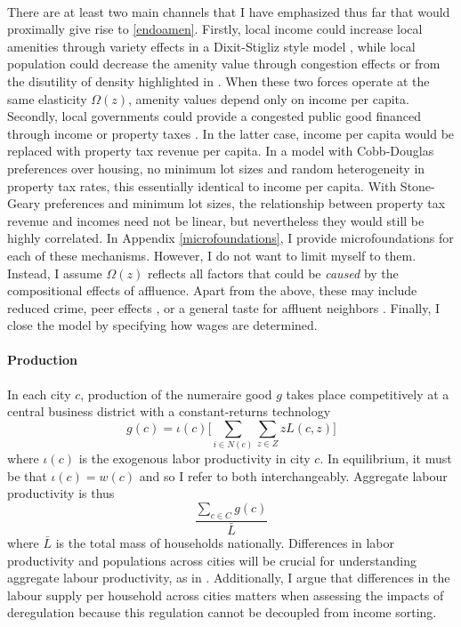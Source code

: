 \documentclass[12pt]{article}
\begin{document}
	 \paragraph*{}
	There are at least two main channels that I have emphasized thus far that would proximally give rise to \eqref{endoamen}. Firstly, local income could increase local amenities through variety effects in a Dixit-Stigliz style model \citep{AlmagroDI, Coutureetal}, while local population could decrease the amenity value through congestion effects or from the disutility of density highlighted in \citep{KSC}. When these two forces operate at the same elasticity $\Omega(z)$, amenity values depend only on income per capita. Secondly, local governments could provide a congested public good financed through income or property taxes \citep{calabresetal, ineffTiebout}. In the latter case, income per capita would be replaced with property tax revenue per capita. In a model with Cobb-Douglas preferences over housing, no minimum lot sizes and random heterogeneity in property tax rates, this essentially identical to income per capita. With Stone-Geary preferences and minimum lot sizes, the relationship between property tax revenue and incomes need not be linear, but nevertheless they would still be highly correlated. In Appendix \ref{microfoundations}, I provide microfoundations for each of these mechanisms. However, I do not want to limit myself to them. Instead, I assume $\Omega(z)$ reflects all factors that could be \textit{caused} by the compositional effects of affluence. Apart from the above, these may include reduced crime, peer effects \citep{chettyhendren}, or a general taste for affluent neighbors \citep{ghh2013, parispoor}. Finally, I close the model by specifying how wages are determined.

	\paragraph*{Production} In each city $c$, production of the numeraire good $g$ takes place competitively at a central business district with a constant-returns technology
	\begin{equation}\label{production}
		g(c) = \iota(c)\bigg[\sum_{i \in N(c)}\sum_{z \in Z}zL(c, z)\bigg]
	\end{equation}
	where $\iota(c)$ is the exogenous labor productivity in city $c$. In equilibrium, it must be that $\iota(c) = w(c)$ and so I 	refer to both interchangeably. Aggregate labour productivity is thus 
	\begin{equation*}
		\frac{\sum_{c \in C}g(c)}{\bar{L}}
	\end{equation*}
	 where $\bar{L}$ is the total mass of households nationally. Differences in labor productivity and populations across cities will be crucial for understanding aggregate labour productivity, as in \cite{hseihmoretti}. Additionally, I argue that differences in the labour supply per household across cities matters when assessing the impacts of deregulation because this regulation cannot be decoupled from income sorting.
 
\end{document}
